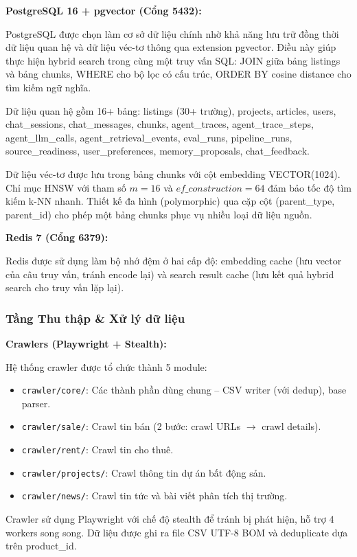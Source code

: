 \textbf{PostgreSQL 16 + pgvector (Cổng 5432):}

PostgreSQL được chọn làm cơ sở dữ liệu chính nhờ khả năng lưu trữ đồng thời dữ liệu quan hệ và dữ liệu véc-tơ thông qua extension pgvector. Điều này giúp thực hiện hybrid search trong cùng một truy vấn SQL: JOIN giữa bảng listings và bảng chunks, WHERE cho bộ lọc có cấu trúc, ORDER BY cosine distance cho tìm kiếm ngữ nghĩa.

Dữ liệu quan hệ gồm 16+ bảng: listings (30+ trường), projects, articles, users, chat\_sessions, chat\_messages, chunks, agent\_traces, agent\_trace\_steps, agent\_llm\_calls, agent\_retrieval\_events, eval\_runs, pipeline\_runs, source\_readiness, user\_preferences, memory\_proposals, chat\_feedback.

Dữ liệu véc-tơ được lưu trong bảng chunks với cột embedding VECTOR(1024). Chỉ mục HNSW với tham số $m=16$ và $ef\_construction=64$ đảm bảo tốc độ tìm kiếm k-NN nhanh. Thiết kế đa hình (polymorphic) qua cặp cột (parent\_type, parent\_id) cho phép một bảng chunks phục vụ nhiều loại dữ liệu nguồn.

\textbf{Redis 7 (Cổng 6379):}

Redis được sử dụng làm bộ nhớ đệm ở hai cấp độ: embedding cache (lưu vector của câu truy vấn, tránh encode lại) và search result cache (lưu kết quả hybrid search cho truy vấn lặp lại).

\subsubsection{Tầng Thu thập \& Xử lý dữ liệu}

\textbf{Crawlers (Playwright + Stealth):}

Hệ thống crawler được tổ chức thành 5 module:
\begin{itemize}
    \item \texttt{crawler/core/}: Các thành phần dùng chung -- CSV writer (với dedup), base parser.
    \item \texttt{crawler/sale/}: Crawl tin bán (2 bước: crawl URLs $\rightarrow$ crawl details).
    \item \texttt{crawler/rent/}: Crawl tin cho thuê.
    \item \texttt{crawler/projects/}: Crawl thông tin dự án bất động sản.
    \item \texttt{crawler/news/}: Crawl tin tức và bài viết phân tích thị trường.
\end{itemize}

Crawler sử dụng Playwright với chế độ stealth để tránh bị phát hiện, hỗ trợ 4 workers song song. Dữ liệu được ghi ra file CSV UTF-8 BOM và deduplicate dựa trên product\_id.

